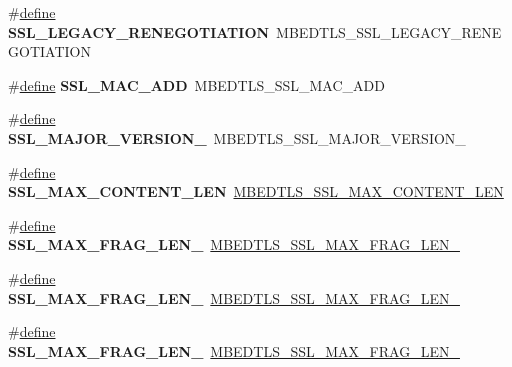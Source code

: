 \begin{DoxyCompactItemize}
\#\hyperlink{structdefine}{define} {\bfseries S\+S\+L\+\_\+\+L\+E\+G\+A\+C\+Y\+\_\+\+R\+E\+N\+E\+G\+O\+T\+I\+A\+T\+I\+ON}~M\+B\+E\+D\+T\+L\+S\+\_\+\+S\+S\+L\+\_\+\+L\+E\+G\+A\+C\+Y\+\_\+\+R\+E\+N\+E\+G\+O\+T\+I\+A\+T\+I\+ON
\item 
\mbox{\label{compat-1_83_8h_a7e5e7a7337db843467532cbcf48d0fb3}} 
\#\hyperlink{structdefine}{define} {\bfseries S\+S\+L\+\_\+\+M\+A\+C\+\_\+\+A\+DD}~M\+B\+E\+D\+T\+L\+S\+\_\+\+S\+S\+L\+\_\+\+M\+A\+C\+\_\+\+A\+DD
\item 
\mbox{\label{compat-1_83_8h_a84391a43fea28830ad138e2418a9728b}} 
\#\hyperlink{structdefine}{define} {\bfseries S\+S\+L\+\_\+\+M\+A\+J\+O\+R\+\_\+\+V\+E\+R\+S\+I\+O\+N\+\_}~M\+B\+E\+D\+T\+L\+S\+\_\+\+S\+S\+L\+\_\+\+M\+A\+J\+O\+R\+\_\+\+V\+E\+R\+S\+I\+O\+N\+\_
\item 
\mbox{\label{compat-1_83_8h_a70bafb07a819e6bf9df2c97ce6dd139d}} 
\#\hyperlink{structdefine}{define} {\bfseries S\+S\+L\+\_\+\+M\+A\+X\+\_\+\+C\+O\+N\+T\+E\+N\+T\+\_\+\+L\+EN}~\hyperlink{ssl_8h_a4a5b73bae4d762a05684812ad6c6b1b2}{M\+B\+E\+D\+T\+L\+S\+\_\+\+S\+S\+L\+\_\+\+M\+A\+X\+\_\+\+C\+O\+N\+T\+E\+N\+T\+\_\+\+L\+EN}
\item 
\mbox{\label{compat-1_83_8h_ad47cd1dca11882e95eb0910d68d6e5c8}} 
\#\hyperlink{structdefine}{define} {\bfseries S\+S\+L\+\_\+\+M\+A\+X\+\_\+\+F\+R\+A\+G\+\_\+\+L\+E\+N\+\_}~\hyperlink{ssl_8h_ad2d55e32e6514fb146b8681ea914b991}{M\+B\+E\+D\+T\+L\+S\+\_\+\+S\+S\+L\+\_\+\+M\+A\+X\+\_\+\+F\+R\+A\+G\+\_\+\+L\+E\+N\+\_}
\item 
\mbox{\label{compat-1_83_8h_a70fac39e6cff2c09dd74185951c06695}} 
\#\hyperlink{structdefine}{define} {\bfseries S\+S\+L\+\_\+\+M\+A\+X\+\_\+\+F\+R\+A\+G\+\_\+\+L\+E\+N\+\_}~\hyperlink{ssl_8h_a08a6eb65d87c8d6565f47689d4e80bd3}{M\+B\+E\+D\+T\+L\+S\+\_\+\+S\+S\+L\+\_\+\+M\+A\+X\+\_\+\+F\+R\+A\+G\+\_\+\+L\+E\+N\+\_}
\item 
\mbox{\label{compat-1_83_8h_a3c29a4f619719fdc1e96189033e0642d}} 
\#\hyperlink{structdefine}{define} {\bfseries S\+S\+L\+\_\+\+M\+A\+X\+\_\+\+F\+R\+A\+G\+\_\+\+L\+E\+N\+\_}~\hyperlink{ssl_8h_adfe756e3f577397f4a3328b0e927bb6a}{M\+B\+E\+D\+T\+L\+S\+\_\+\+S\+S\+L\+\_\+\+M\+A\+X\+\_\+\+F\+R\+A\+G\+\_\+\+L\+E\+N\+\_}

\end{DoxyCompactItemize}
